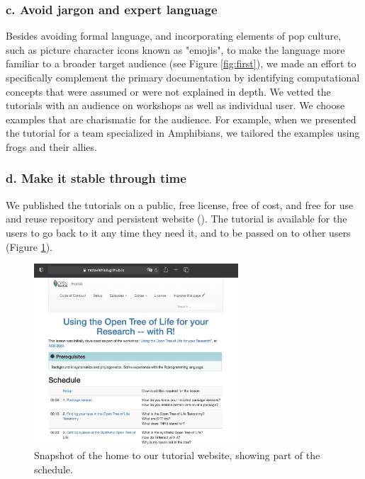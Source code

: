 \documentclass[12pt]{article}
\begin{document}
\subsubsection*{c. Avoid jargon and expert language}

Besides avoiding formal language, and incorporating elements of pop culture, such as picture
character icons known as "emojis", to make the language more familiar to a
broader target audience (see Figure \ref{fig:first}), we made an effort to specifically
complement the primary documentation by identifying
computational concepts that were assumed or were not explained in depth.
We vetted the tutorials with an audience on workshops as well as individual user.
We choose examples that are charismatic for the audience.
For example, when we presented the tutorial for a team specialized in Amphibians,
we tailored the examples using frogs and their allies.


\subsubsection*{d. Make it stable through time}

We published the tutorials on a public, free license, free of cost, and free for
use and reuse repository and persistent website (\cite{RopentreeTutorials, RopentreeTutorialsWebsite}).
The tutorial is available for the users to go back to it any time they need it,
and to be passed on to other users (Figure \ref{fig:second}).

\begin{figure}
\begin{center}
\includegraphics[width=3in]{fig2.png}
\end{center}
\caption{Snapshot of the home to our tutorial website, showing part of the schedule. \label{fig:second}}
\end{figure}
\end{document}
